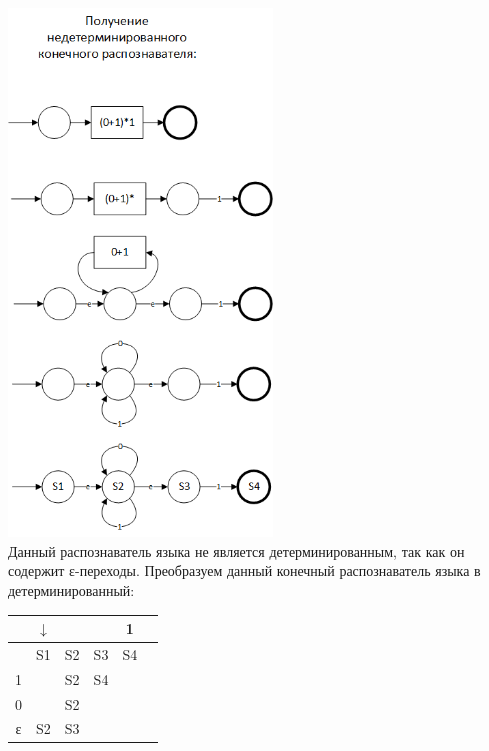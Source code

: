 \documentclass[a4paper,14pt]{extarticle}
\begin{document}
\begin{enumerate}[1.]
\includegraphics[width=70mm]{task2_non_determined}\\
Данный распознаватель языка не является детерминированным, 
так как он содержит ε-переходы. 
Преобразуем данный конечный распознаватель языка в детерминированный:\\
\begin{tabular}{|c|c|c|c|c|c|}
	\hline
	   & $\downarrow$ &    &    & 1  \\
	\hline
	   & S1           & S2 & S3 & S4 \\
	\hline
	1  &              & S2 & S4 &    \\
	\hline
	0  &              & S2 &    &    \\
	\hline
	ε  & S2           & S3 &    &    \\
	\hline
\end{tabular}


\end{enumerate}
\end{document}
